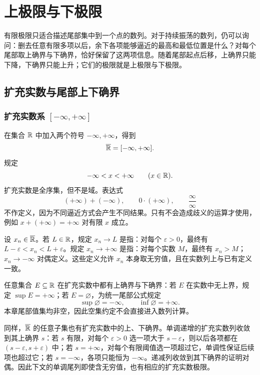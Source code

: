 \chapter{上极限与下极限}
\label{chap:limsup-liminf}

有限极限只适合描述尾部集中到一个点的数列。对于持续振荡的数列，仍可以询问：删去任意有限多项以后，余下各项能够逼近的最高和最低位置是什么？对每个尾部取上确界与下确界，恰好保留了这两项信息。随着尾部起点后移，上确界只能下降，下确界只能上升；它们的极限就是上极限与下极限。

\section{扩充实数与尾部上下确界}

\subsection{扩充实数系 \texorpdfstring{\([-\infty,+\infty]\)}{[-infinity,+infinity]}}


在集合 \(\mathbb{R}\) 中加入两个符号 \(-\infty,+\infty\)，得到
\[
 \overline{\mathbb{R}}=[-\infty,+\infty].
\]
规定
\[
 -\infty<x<+\infty\qquad(x\in\mathbb{R}).
\]
扩充实数是全序集，但不是域。表达式
\[
 (+\infty)+(-\infty),\qquad 0\cdot(+\infty),\qquad
 \frac{\infty}{\infty}
\]
不作定义，因为不同逼近方式会产生不同结果。只有不会造成歧义的运算才使用，例如 \(x+(+\infty)=+\infty\) 对有限 \(x\) 成立。

\begin{definition}
设 \(x_n\in\overline{\mathbb{R}}\)。若 \(L\in\mathbb{R}\)，规定 \(x_n\to L\) 是指：对每个 \(\varepsilon>0\)，最终有
\(L-\varepsilon<x_n<L+\varepsilon\)。规定 \(x_n\to+\infty\) 是指：对每个实数 \(M\)，最终有 \(x_n>M\)；\(x_n\to-\infty\) 对偶定义。这些定义允许 \(x_n\) 本身取无穷值，且在实数列上与已有定义一致。
\end{definition}

任意集合 \(E\subseteq\mathbb{R}\) 在扩充实数中都有上确界与下确界：若 \(E\) 在实数中无上界，规定 \(\sup E=+\infty\)；若 \(E=\varnothing\)，为统一尾部公式规定
\[
 \sup\varnothing=-\infty,\qquad
 \inf\varnothing=+\infty.
\]
本章尾部值集均非空，因此空集约定不会直接进入数列计算。

同样，\(\overline{\mathbb{R}}\) 的任意子集也有扩充实数中的上、下确界。单调递增的扩充实数列收敛到其上确界 \(s\)：若 \(s\) 有限，对每个 \(\varepsilon>0\) 选一项大于 \(s-\varepsilon\)，则以后各项都在 \((s-\varepsilon,s+\varepsilon)\) 中；若 \(s=+\infty\)，对每个有限阈值选一项超过它，单调性保证后续项也超过它；若 \(s=-\infty\)，各项只能恒为 \(-\infty\)。递减列收敛到其下确界的证明对偶。因此下文的单调尾列即使含无穷值，也有相应的扩充实数极限。

